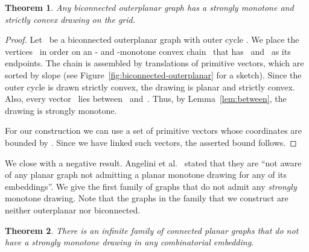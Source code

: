 \documentclass[a4paper,11pt]{article}
\theoremstyle{plain}
\newtheorem{theorem}{Theorem}
\begin{document}
\begin{theorem}
  Any biconnected outerplanar graph has a strongly monotone and
  strictly convex drawing on the  grid.
\end{theorem}

\begin{proof}
  Let~ be a biconnected outerplanar graph with outer cycle
  .
  We place the vertices~
  in order on an - and -monotone convex chain~ that
  has~ and~ as its endpoints. The chain is assembled by
  translations of  primitive vectors, which are sorted by slope
  (see Figure~\ref{fig:biconnected-outerplanar} for a sketch).
  Since the outer cycle is drawn strictly convex, the drawing is planar
  and strictly convex.
Also, every vector~ lies between~
  and~. Thus, by Lemma~\ref{lem:between}, the drawing is
  strongly monotone. 
  
  For our construction we can use a set of
primitive vectors whose coordinates are bounded by .
  Since we have linked  such vectors, the
  asserted bound follows.
\end{proof}

We close with a negative result.  Angelini et
al.~\cite[p.~33]{acbfp-mdg-12} stated that they are ``not aware of any
planar graph not admitting a planar monotone drawing for any of its
embeddings''.  We give the first family of graphs that
  do not admit any \emph{strongly} monotone drawing.  Note that the
graphs in the family that we construct are neither outerplanar nor
biconnected.

\begin{theorem}
  There is an infinite family of connected planar graphs
  that do not have a strongly monotone drawing in any combinatorial embedding.
\end{theorem}
\end{document}
